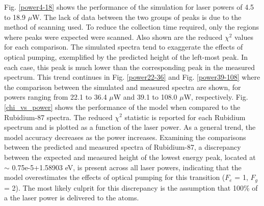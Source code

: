 Fig. \ref{power4-18} shows the performance of the simulation for laser powers of 4.5 to 18.9 $\mu$W. The lack of data between the two groups of peaks is due to the method of scanning used. To reduce the collection time required, only the regions where peaks were expected were scanned. Also shown are the reduced $\chi^2$ values for each comparison. The simulated spectra tend to exaggerate the effects of optical pumping, exemplified by the predicted height of the left-most peak. In each case, this peak is much lower than the corresponding peak in the measured spectrum. This trend continues in Fig. \ref{power22-36} and Fig. \ref{power39-108} where the comparison between the simulated and measured spectra are shown, for powers ranging from 22.1 to 36.4 $\mu$W and 39.1 to 108.0 $\mu$W, respectively. Fig. \ref{chi_vs_power} shows the performance of the model when compared to the Rubidium-87 spectra. The reduced $\chi^2$ statistic is reported for each Rubidium spectrum and is plotted as a function of the laser power. As a general trend, the model accuracy decreases as the power increases. Examining the comparisons between the predicted and measured spectra of Rubidium-87, a discrepancy between the expected and measured height of the lowest energy peak, located at $\sim$ 0.75e-5+1.58903 eV, is present across all laser powers, indicating that the model overestimates the effects of optical pumping for this transition ($F_e$ = 1, $F_g$ = 2). The most likely culprit for this discrepancy is the assumption that 100\% of a the laser power is delivered to the atoms.  

